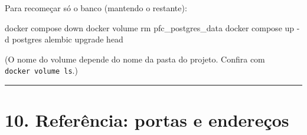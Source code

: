 \documentclass[
  brazilian,
  a4paper,12pt,oneside]{report}
\newenvironment{Shaded}{}{}
\newcommand{\FunctionTok}[1]{\textcolor[rgb]{0.02,0.16,0.49}{#1}}
\newcommand{\NormalTok}[1]{#1}
\newcommand{\OperatorTok}[1]{\textcolor[rgb]{0.40,0.40,0.40}{#1}}
\begin{document}
Para recomeçar só o banco (mantendo o restante):

\begin{Shaded}
\begin{Highlighting}[]
\NormalTok{docker compose down}
\NormalTok{docker volume }\FunctionTok{rm}\NormalTok{ pfc\_postgres\_data}
\NormalTok{docker compose up }\OperatorTok{{-}}\NormalTok{d postgres}
\NormalTok{alembic upgrade head}
\end{Highlighting}
\end{Shaded}

(O nome do volume depende do nome da pasta do projeto. Confira com
\texttt{docker\ volume\ ls}.)

\begin{center}\rule{0.5\linewidth}{0.5pt}\end{center}

\chapter{10. Referência: portas e
endereços}\label{referuxeancia-portas-e-endereuxe7os}
\end{document}
